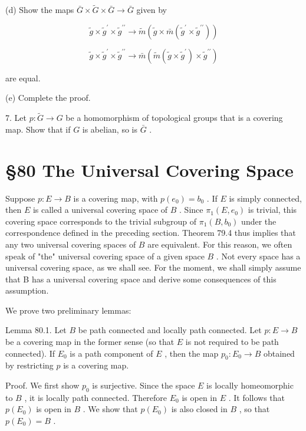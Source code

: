\documentclass[10pt]{article}
\begin{document}
(d) Show the maps \(\bar{G} \times  \widetilde{G} \times  \bar{G} \rightarrow  \bar{G}\) given by

\[
\widetilde{g} \times  {\widetilde{g}}^{\prime } \times  {\widetilde{g}}^{\prime \prime } \rightarrow  \widetilde{m}\left( {\widetilde{g} \times  \bar{m}\left( {{\widetilde{g}}^{\prime } \times  {\widetilde{g}}^{\prime \prime }}\right) }\right)
\]

\[
\widetilde{g} \times  {\widetilde{g}}^{\prime } \times  {\widetilde{g}}^{\prime \prime } \rightarrow  \bar{m}\left( {\widetilde{m}\left( {\widetilde{g} \times  {\widetilde{g}}^{\prime }}\right)  \times  {\widetilde{g}}^{\prime \prime }}\right)
\]

are equal.

(e) Complete the proof.

7. Let \(p : \widetilde{G} \rightarrow  G\) be a homomorphism of topological groups that is a covering map. Show that if \(G\) is abelian, so is \(\bar{G}\) .

\section*{§80 The Universal Covering Space}

Suppose \(p : E \rightarrow  B\) is a covering map, with \(p\left( {e}_{0}\right)  = {b}_{0}\) . If \(E\) is simply connected, then \(E\) is called a universal covering space of \(B\) . Since \({\pi }_{1}\left( {E,{e}_{0}}\right)\) is trivial, this covering space corresponds to the trivial subgroup of \({\pi }_{1}\left( {B,{b}_{0}}\right)\) under the correspondence defined in the preceding section. Theorem 79.4 thus implies that any two universal covering spaces of \(B\) are equivalent. For this reason, we often speak of "the" universal covering space of a given space \(B\) . Not every space has a universal covering space, as we shall see. For the moment, we shall simply assume that B has a universal covering space and derive some consequences of this assumption.

We prove two preliminary lemmas:

Lemma 80.1. Let \(B\) be path connected and locally path connected. Let \(p : E \rightarrow  B\) be a covering map in the former sense (so that \(E\) is not required to be path connected). If \({E}_{0}\) is a path component of \(E\) , then the map \({p}_{0} : {E}_{0} \rightarrow  B\) obtained by restricting \(p\) is a covering map.

Proof. We first show \({p}_{0}\) is surjective. Since the space \(E\) is locally homeomorphic to \(B\) , it is locally path connected. Therefore \({E}_{0}\) is open in \(E\) . It follows that \(p\left( {E}_{0}\right)\) is open in \(B\) . We show that \(p\left( {E}_{0}\right)\) is also closed in \(B\) , so that \(p\left( {E}_{0}\right)  = B\) .
\end{document}
